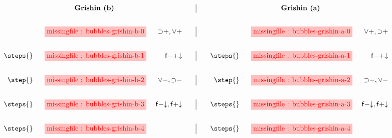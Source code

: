 \setlength{\fboxsep}{2pt}
\setlength{\arraycolsep}{0pt}
\newcommand{\vsp}{\vspace{2em}}
$$
\begin{array}[t]{rcr@{\qquad}|@{\qquad}rcr@{\vsp}}
       &\text{\textbf{Grishin (b)}} &&
       &\text{\textbf{Grishin (a)}} & \\

       &\stkfig{1}{bubbles-grishin-b-0} &{\limp}{+}, {\lor}{+} &
       &\stkfig{1}{bubbles-grishin-a-0} &{\lor}{+}, {\limp}{+} \\

\steps{} &\stkfig{1}{bubbles-grishin-b-1} &{\mathsf{f{-}{+}{\da}}} &
\steps{} &\stkfig{1}{bubbles-grishin-a-1} &{\mathsf{f{-}{+}{\da}}} \\

\step{}  &\stkfig{1}{bubbles-grishin-b-2} &{\lor}{-}, {\limp}{-} &
\step{}  &\stkfig{1}{bubbles-grishin-a-2} &{\limp}{-}, {\lor}{-} \\

\steps{} &\stkfig{1}{bubbles-grishin-b-3} &\mathsf{f{-}{\da}}, \mathsf{f{+}{\da}} &
\steps{} &\stkfig{1}{bubbles-grishin-a-3} &\mathsf{f{-}{\da}}, \mathsf{f{+}{\da}} \\

\steps{} &\stkfig{1}{bubbles-grishin-b-4} & &
\steps{} &\stkfig{1}{bubbles-grishin-a-4} &
\end{array}
$$
